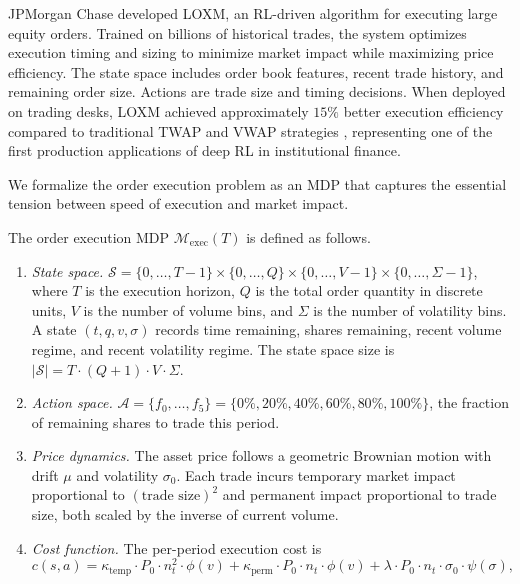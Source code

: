 JPMorgan Chase developed LOXM, an RL-driven algorithm for executing large equity orders. Trained on billions of historical trades, the system optimizes execution timing and sizing to minimize market impact while maximizing price efficiency. The state space includes order book features, recent trade history, and remaining order size. Actions are trade size and timing decisions. When deployed on trading desks, LOXM achieved approximately $15\%$ better execution efficiency compared to traditional TWAP and VWAP strategies \citep{JPMorgan2018}, representing one of the first production applications of deep RL in institutional finance.

We formalize the order execution problem as an MDP that captures the essential tension between speed of execution and market impact.

\begin{definition}
\label{def:execution_mdp}
The order execution MDP $\mathcal{M}_{\mathrm{exec}}(T)$ is defined as follows.
\begin{enumerate}
    \item \emph{State space.} $\mathcal{S} = \{0, \ldots, T-1\} \times \{0, \ldots, Q\} \times \{0, \ldots, V-1\} \times \{0, \ldots, \Sigma-1\}$, where $T$ is the execution horizon, $Q$ is the total order quantity in discrete units, $V$ is the number of volume bins, and $\Sigma$ is the number of volatility bins. A state $(t, q, v, \sigma)$ records time remaining, shares remaining, recent volume regime, and recent volatility regime. The state space size is $|\mathcal{S}| = T \cdot (Q+1) \cdot V \cdot \Sigma$.
    \item \emph{Action space.} $\mathcal{A} = \{f_0, \ldots, f_5\} = \{0\%, 20\%, 40\%, 60\%, 80\%, 100\%\}$, the fraction of remaining shares to trade this period.
    \item \emph{Price dynamics.} The asset price follows a geometric Brownian motion with drift $\mu$ and volatility $\sigma_0$. Each trade incurs temporary market impact proportional to $(\text{trade size})^2$ and permanent impact proportional to trade size, both scaled by the inverse of current volume.
    \item \emph{Cost function.} The per-period execution cost is
    \begin{equation}
    \label{eq:execution_cost}
    c(s, a) = \kappa_{\mathrm{temp}} \cdot P_0 \cdot n_t^2 \cdot \phi(v) + \kappa_{\mathrm{perm}} \cdot P_0 \cdot n_t \cdot \phi(v) + \lambda \cdot P_0 \cdot n_t \cdot \sigma_0 \cdot \psi(\sigma),
    \end{equation}

\end{enumerate}
\end{definition}
